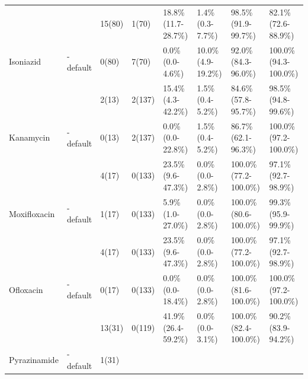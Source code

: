 \begin{table}
{\begin{tabular}{|l|l|l|l|l|l|l|l|}
 &
  \mykrobe{} &
  15(80) &
  1(70) &
  18.8\% (11.7-28.7\%) &
  1.4\% (0.3-7.7\%) &
  98.5\% (91.9-99.7\%) &
  82.1\% (72.6-88.9\%) \\ \cline{2-8} 
\multirow{-2}{*}{Isoniazid} &
  \cellcolor[HTML]{EFEFEF}\mykrobe{}-default &
  \cellcolor[HTML]{EFEFEF}0(80) &
  \cellcolor[HTML]{EFEFEF}7(70) &
  \cellcolor[HTML]{EFEFEF}0.0\% (0.0-4.6\%) &
  \cellcolor[HTML]{EFEFEF}10.0\% (4.9-19.2\%) &
  \cellcolor[HTML]{EFEFEF}92.0\% (84.3-96.0\%) &
  \cellcolor[HTML]{EFEFEF}100.0\% (94.3-100.0\%) \\ \hline
 &
  \mykrobe{} &
  2(13) &
  2(137) &
  15.4\% (4.3-42.2\%) &
  1.5\% (0.4-5.2\%) &
  84.6\% (57.8-95.7\%) &
  98.5\% (94.8-99.6\%) \\ \cline{2-8} 
\multirow{-2}{*}{Kanamycin} &
  \cellcolor[HTML]{EFEFEF}\mykrobe{}-default &
  \cellcolor[HTML]{EFEFEF}0(13) &
  \cellcolor[HTML]{EFEFEF}2(137) &
  \cellcolor[HTML]{EFEFEF}0.0\% (0.0-22.8\%) &
  \cellcolor[HTML]{EFEFEF}1.5\% (0.4-5.2\%) &
  \cellcolor[HTML]{EFEFEF}86.7\% (62.1-96.3\%) &
  \cellcolor[HTML]{EFEFEF}100.0\% (97.2-100.0\%) \\ \hline
 &
  \mykrobe{} &
  4(17) &
  0(133) &
  23.5\% (9.6-47.3\%) &
  0.0\% (0.0-2.8\%) &
  100.0\% (77.2-100.0\%) &
  97.1\% (92.7-98.9\%) \\ \cline{2-8} 
\multirow{-2}{*}{Moxifloxacin} &
  \cellcolor[HTML]{EFEFEF}\mykrobe{}-default &
  \cellcolor[HTML]{EFEFEF}1(17) &
  \cellcolor[HTML]{EFEFEF}0(133) &
  \cellcolor[HTML]{EFEFEF}5.9\% (1.0-27.0\%) &
  \cellcolor[HTML]{EFEFEF}0.0\% (0.0-2.8\%) &
  \cellcolor[HTML]{EFEFEF}100.0\% (80.6-100.0\%) &
  \cellcolor[HTML]{EFEFEF}99.3\% (95.9-99.9\%) \\ \hline
 &
  \mykrobe{} &
  4(17) &
  0(133) &
  23.5\% (9.6-47.3\%) &
  0.0\% (0.0-2.8\%) &
  100.0\% (77.2-100.0\%) &
  97.1\% (92.7-98.9\%) \\ \cline{2-8} 
\multirow{-2}{*}{Ofloxacin} &
  \cellcolor[HTML]{EFEFEF}\mykrobe{}-default &
  \cellcolor[HTML]{EFEFEF}0(17) &
  \cellcolor[HTML]{EFEFEF}0(133) &
  \cellcolor[HTML]{EFEFEF}0.0\% (0.0-18.4\%) &
  \cellcolor[HTML]{EFEFEF}0.0\% (0.0-2.8\%) &
  \cellcolor[HTML]{EFEFEF}100.0\% (81.6-100.0\%) &
  \cellcolor[HTML]{EFEFEF}100.0\% (97.2-100.0\%) \\ \hline
 &
  \mykrobe{} &
  13(31) &
  0(119) &
  41.9\% (26.4-59.2\%) &
  0.0\% (0.0-3.1\%) &
  100.0\% (82.4-100.0\%) &
  90.2\% (83.9-94.2\%) \\ \cline{2-8} 
\multirow{-2}{*}{Pyrazinamide} &
  \cellcolor[HTML]{EFEFEF}\mykrobe{}-default &
  \cellcolor[HTML]{EFEFEF}1(31) &

\end{tabular}}
\end{table}
